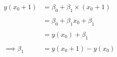 \documentclass{article}
\begin{document}
\begin{align}
y(x_0 + 1) &= \beta_0 + \beta_1 \times (x_0 + 1)\\ \\
&= \beta_0 + \beta_1 x_0 + \beta_1\\ \\
&= y(x_0) + \beta_1\\ \\
\implies \beta_1 &= y(x_0 + 1) - y(x_0)
\end{align}
\end{document}
